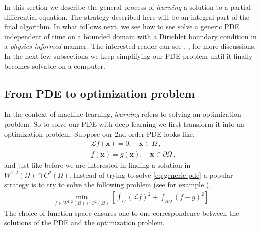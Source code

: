 In this section we describe the general process of \textit{learning} a solution to a partial differential equation. The strategy described here will be an integral part of the final algorithm. In what follows next, we see how to see solve a generic PDE independent of time on a bounded domain with a Dirichlet boundary condition in a \textit{physics-informed} manner.  The interested reader can see \cite{raissi2019physics}, \cite{blechschmidt2021three}, \cite{sirignano2018dgm} for more discussions. In the next few subsections we keep simplifying our PDE problem until it finally becomes solvable on a computer.

\subsection{From PDE to optimization problem} In the context of machine learning, \textit{learning} refers to solving an optimization problem. So to solve our PDE with deep learning we first transform it into an optimization problem. Suppose our 2nd order PDE looks like, 
\begin{equation}
\begin{aligned}
    &\mathcal Lf(\mathbf x) = 0,\quad \mathbf x\in\Omega \,, \\
    &f(\mathbf x) = g(\mathbf x),\quad \mathbf x\in\partial\Omega \,,
\end{aligned}\label{eq:generic-pde}
\end{equation}
and just like before we are interested in finding a solution in $W^{1,2}(\Omega)\cap C^2(\Omega)$. Instead of trying to solve \eqref{eq:generic-pde} a popular strategy is to try to solve the following problem (see for example \cite{sirignano2018dgm}),
\begin{align}
    \min_{f\in W^{1,2}(\Omega)\cap C^2(\Omega)}\left[\int_\Omega (\mathcal L f)^2 + \int_{\partial\Omega}(f-g)^2\right]\label{eq:generic-pde-opt}
\end{align}
The choice of function space ensures one-to-one correspondence between the solutions of the PDE and the optimization problem.

